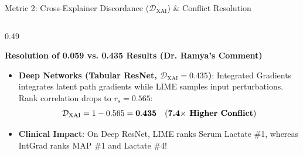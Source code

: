 \documentclass[aspectratio=169,10pt]{beamer}
\begin{document}
\begin{frame}{Metric 2: Cross-Explainer Discordance ($\mathcal{D}_{\text{XAI}}$) \& Conflict Resolution}
\begin{columns}[t]
\begin{column}{0.49\textwidth}
\begin{exampleblock}{\textbf{Resolution of 0.059 vs. 0.435 Results (Dr. Ramya's Comment)}}
\begin{itemize}
          $$\mathcal{D}_{\text{XAI}} = 1 - 0.941 = \mathbf{0.059} \quad (\text{Tight Concordance})$$
          Explainers maintain consistent consensus for physicians.
          \item \textbf{Deep Networks (Tabular ResNet, $\mathcal{D}_{\text{XAI}} = 0.435$)}:
          Integrated Gradients integrates latent path gradients while LIME samples input perturbations. Rank correlation drops to $r_s = 0.565$:
          $$\mathcal{D}_{\text{XAI}} = 1 - 0.565 = \mathbf{0.435} \quad (\text{\textbf{7.4$\times$ Higher Conflict}})$$
          \item \textbf{Clinical Impact}: On Deep ResNet, LIME ranks Serum Lactate \#1, whereas IntGrad ranks MAP \#1 and Lactate \#4!
        \end{itemize}
      \end{exampleblock}
    \end{column}
  \end{columns}
\end{frame}
\end{document}
